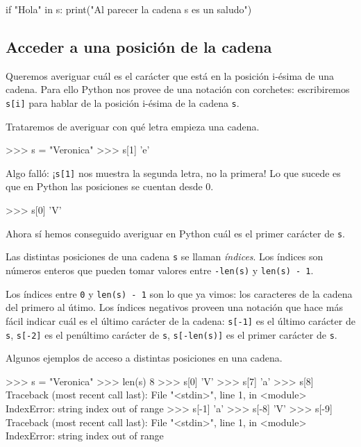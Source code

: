 \begin{codigo-python-sn}
if "Hola" in s:
    print("Al parecer la cadena s es un saludo")
\end{codigo-python-sn}

\subsection{Acceder a una posición de la cadena}

Queremos averiguar cuál es el carácter que está en la posición i-ésima de
una cadena.  Para ello Python nos provee de una notación con corchetes:
escribiremos \lstinline+s[i]+ para hablar de la posición i-ésima de la cadena
\lstinline!s!.

Trataremos de averiguar con qué letra empieza una cadena.

\begin{codigo-python-sn}
>>> s = "Veronica"
>>> s[1]
'e'
\end{codigo-python-sn}

Algo falló: ¡\lstinline+s[1]+ nos muestra la segunda letra, no la
primera! Lo que sucede es que en Python las posiciones se cuentan
desde 0.

\begin{codigo-python-sn}
>>> s[0]
'V'
\end{codigo-python-sn}

Ahora sí hemos conseguido averiguar en Python cuál es el primer carácter de
\lstinline!s!.

\begin{atencion}
Las distintas posiciones de una cadena \lstinline!s! se llaman
\emph{índices}. Los índices son números enteros que pueden tomar
valores entre \lstinline!-len(s)! y \lstinline!len(s) - 1!.

Los índices entre \lstinline!0! y \lstinline!len(s) - 1! son lo que ya
vimos: los caracteres de la cadena del primero al útimo. Los índices
negativos proveen una notación que hace más fácil indicar cuál es el último
carácter de la cadena: \lstinline!s[-1]! es el último carácter de
\lstinline!s!, \lstinline!s[-2]! es el penúltimo carácter de \lstinline!s!,
\lstinline!s[-len(s)]! es el primer carácter de \lstinline!s!.
\end{atencion}

Algunos ejemplos de acceso a distintas posiciones en una cadena.

\begin{codigo-python-sn}
>>> s = "Veronica"
>>> len(s)
8
>>> s[0]
'V'
>>> s[7]
'a'
>>> s[8]
Traceback (most recent call last):
  File "<stdin>", line 1, in <module>
IndexError: string index out of range
>>> s[-1]
'a'
>>> s[-8]
'V'
>>> s[-9]
Traceback (most recent call last):
  File "<stdin>", line 1, in <module>
IndexError: string index out of range
\end{codigo-python-sn}

